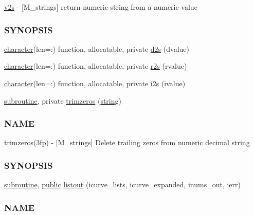 \begin{DoxyCompactItemize}
\begin{DoxyCompactList}
\hyperlink{interfacem__strings_1_1v2s}{v2s} -\/ \mbox{[}M\+\_\+strings\mbox{]} return numeric string from a numeric value \subsubsection*{S\+Y\+N\+O\+P\+S\+IS}\end{DoxyCompactList}\item 
\hyperlink{option__stopwatch_83_8txt_abd4b21fbbd175834027b5224bfe97e66}{character}(len=\+:) function, allocatable, private \hyperlink{namespacem__strings_ae4fac72ec3065d73aa06a107e41004b7}{d2s} (dvalue)
\item 
\hyperlink{option__stopwatch_83_8txt_abd4b21fbbd175834027b5224bfe97e66}{character}(len=\+:) function, allocatable, private \hyperlink{namespacem__strings_a5adef1b5667afe21e0ee21cfdba13b45}{r2s} (rvalue)
\item 
\hyperlink{option__stopwatch_83_8txt_abd4b21fbbd175834027b5224bfe97e66}{character}(len=\+:) function, allocatable, private \hyperlink{namespacem__strings_a83cecfcd4582760bf2b1e12364c29443}{i2s} (ivalue)
\item 
\hyperlink{M__stopwatch_83_8txt_acfbcff50169d691ff02d4a123ed70482}{subroutine}, private \hyperlink{namespacem__strings_a956638e87e83520f170ccefefac6722b}{trimzeros} (\hyperlink{what__overview_81_8txt_a74cb7e955273b9f9157b4f0c18a38849}{string})
\begin{DoxyCompactList}\small\item\em \subsubsection*{N\+A\+ME}

trimzeros(3fp) -\/ \mbox{[}M\+\_\+strings\mbox{]} Delete trailing zeros from numeric decimal string \subsubsection*{S\+Y\+N\+O\+P\+S\+IS}\end{DoxyCompactList}\item 
\hyperlink{M__stopwatch_83_8txt_acfbcff50169d691ff02d4a123ed70482}{subroutine}, \hyperlink{M__stopwatch_83_8txt_a2f74811300c361e53b430611a7d1769f}{public} \hyperlink{namespacem__strings_a81b4b7f4f301b9e17604adbcace58d0c}{listout} (icurve\+\_\+lists, icurve\+\_\+expanded, inums\+\_\+out, ierr)
\begin{DoxyCompactList}\small\item\em \subsubsection*{N\+A\+ME}


\end{DoxyCompactList}
\end{DoxyCompactItemize}
